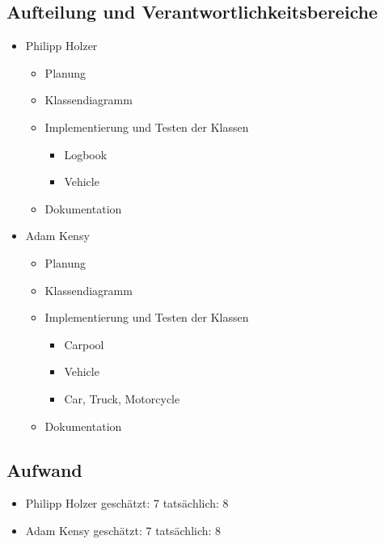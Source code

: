 \subsection{Aufteilung und Verantwortlichkeitsbereiche}
\begin{itemize}
	\item Philipp Holzer
		\begin{itemize}
		\item Planung
		\item Klassendiagramm
		\item Implementierung und Testen der Klassen
			\begin{itemize}
			\item Logbook
			\item Vehicle
			\end{itemize}
		\item Dokumentation
		\end{itemize}
	\item Adam Kensy
		\begin{itemize}
		\item Planung
		\item Klassendiagramm
		\item Implementierung und Testen der Klassen
			\begin{itemize}
			\item Carpool
			\item Vehicle
			\item Car, Truck, Motorcycle
			\end{itemize}
		\item Dokumentation
		\end{itemize}
\end{itemize}

\subsection{Aufwand}
\begin{itemize}
	\item Philipp Holzer		\tab geschätzt: 7	\tab tatsächlich: 8
	\item Adam Kensy		\tab  geschätzt:	7	\tab  tatsächlich: 8
\end{itemize}




